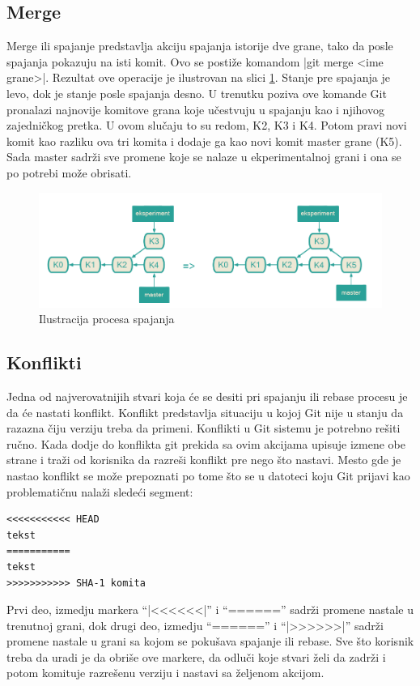 \documentclass[a4paper]{article}
\begin{document}
{\subsection{Merge}
\label{subsec:merge}
Merge ili spajanje predstavlja akciju spajanja istorije dve grane, tako da posle spajanja pokazuju na isti komit. Ovo se postiže komandom |git merge <ime grane>|. Rezultat ove operacije je ilustrovan na slici \ref{fig:merge}. Stanje pre spajanja je levo, dok je stanje posle spajanja desno. U trenutku poziva ove komande Git pronalazi najnovije komitove grana koje učestvuju u spajanju kao i njihovog zajedničkog pretka. U ovom slučaju to su redom, K2, K3 i K4. Potom pravi novi komit kao razliku ova tri komita i dodaje ga kao novi komit master grane (K5). Sada master sadrži sve promene koje se nalaze u ekperimentalnoj grani i ona se po potrebi može obrisati.
\begin{figure}[h!]
\begin{center}
\includegraphics[scale=0.3]{images/merge.png}
\end{center}
\caption{Ilustracija procesa spajanja}
\label{fig:merge}
\end{figure}

\subsection{Konflikti}
Jedna od najverovatnijih stvari koja će se desiti pri spajanju ili rebase procesu je da će nastati konflikt. Konflikt predstavlja situaciju u kojoj Git nije u stanju da razazna čiju verziju treba da primeni. Konflikti u Git sistemu je potrebno rešiti ručno. Kada dodje do konflikta git prekida sa ovim akcijama upisuje izmene obe strane i traži od korisnika da razreši konflikt pre nego što nastavi. Mesto gde je nastao konflikt se može prepoznati po tome što se u datoteci koju Git prijavi kao problematičnu nalaži sledeći segment:
\begin{lstlisting}
<<<<<<<<<<< HEAD
tekst
===========
tekst
>>>>>>>>>>> SHA-1 komita
\end{lstlisting}
Prvi deo, izmedju markera ``|<<<<<<|'' i ``======'' sadrži promene nastale u trenutnoj grani, dok drugi deo, izmedju  ``======'' i ``|>>>>>>|'' sadrži promene nastale u grani sa kojom se pokušava spajanje ili rebase. Sve što korisnik treba da uradi je da obriše ove markere, da odluči koje stvari želi da zadrži i potom komituje razrešenu verziju i nastavi sa željenom akcijom.
}
\end{document}
